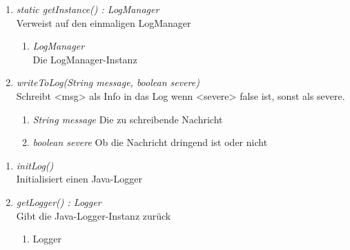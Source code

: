 \begin{enumerate}[+]

	\item \textit{static getInstance() : LogManager}  \\ Verweist auf den einmaligen LogManager
	
	\vspace{-0.2cm}
	\begin{enumerate}[$\circ$]
		\item \textit{LogManager} \\ Die LogManager-Instanz
	\end{enumerate}

\item \textit{writeToLog(String message, boolean severe)} \\ Schreibt <msg> als Info in das Log wenn <severe> false ist,
sonst als severe.
\begin{enumerate}[$\bullet$]
\item \textit{String message} Die zu schreibende Nachricht
\item \textit{boolean severe} Ob die Nachricht dringend ist oder nicht
\end{enumerate}
\end{enumerate}


\begin{enumerate}[$-$]

\item \textit{initLog()} \\ Initialisiert einen Java-Logger
\vspace{-0.2cm}

\item \textit{getLogger() : Logger} \\ Gibt die Java-Logger-Instanz zurück
\begin{enumerate}[$\circ$]
	\item Logger
\end{enumerate}
\end{enumerate}
	